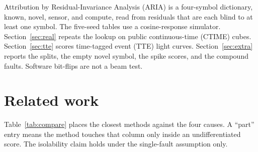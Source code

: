 \documentclass{ieeeaccess}
\begin{document}
Attribution by Residual-Invariance Analysis (ARIA) is a four-symbol dictionary, known, novel, sensor, and compute, read from residuals that are each blind to at least one symbol. The five-seed tables use a cosine-response simulator. Section~\ref{sec:real} repeats the lookup on \RealCubes{} public continuous-time (CTIME) cubes. Section~\ref{sec:tte} scores time-tagged event (TTE) light curves. Section~\ref{sec:extra} reports the splits, the empty novel symbol, the spike scores, and the compound faults. Software bit-flips are not a beam test.

\section{Related work}
\label{sec:related}

Table~\ref{tab:compare} places the closest methods against the four causes. A ``part'' entry means the method touches that column only inside an undifferentiated score. The isolability claim holds under the single-fault assumption only.
\end{document}
